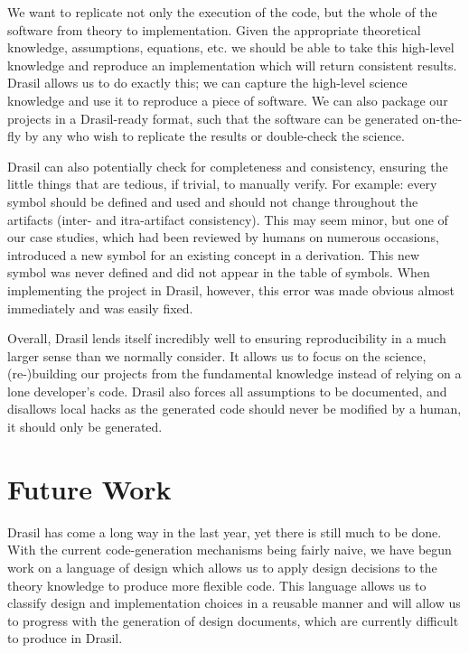 \documentclass[sigconf]{acmart}
\begin{document}
We want to replicate not only the execution of the code, but the whole of the 
software from theory to implementation. Given the appropriate theoretical 
knowledge, assumptions, equations, etc. we should be able to take this 
high-level knowledge and reproduce an implementation which will return 
consistent results. Drasil allows us to do exactly this; we can capture the 
high-level science knowledge and use it to reproduce a piece of software. We 
can also package our projects in a Drasil-ready format, such that the software 
can be generated on-the-fly by any who wish to replicate the results or 
double-check the science.

Drasil can also potentially check for completeness and consistency, ensuring 
the little things that are tedious, if trivial, to manually verify. For 
example: every symbol should be defined and used and should not change 
throughout the artifacts (inter- and itra-artifact consistency). This may seem 
minor, but one of our case studies, which had been reviewed by humans on 
numerous occasions, introduced a new symbol for an existing concept in a 
derivation. This new symbol was never defined and did not appear in the table of 
symbols. When implementing the project in Drasil, however, this error was made 
obvious almost immediately and was easily fixed.

Overall, Drasil lends itself incredibly well to ensuring reproducibility in a 
much larger sense than we normally consider. It allows us to focus on the 
science, (re-)building our projects from the fundamental knowledge instead of 
relying on a lone developer's code. Drasil also forces all assumptions to be 
documented, and disallows local hacks as the generated code should never be 
modified by a human, it should only be generated.

\section{Future Work} \label{SecFuture}

Drasil has come a long way in the last year, yet there is still much to be 
done. With the current code-generation mechanisms being fairly naive, we have 
begun work on a language of design which allows us to apply design decisions to 
the theory knowledge to produce more flexible code. This language allows us to 
classify design and implementation choices in a reusable manner and will 
allow us to progress with the generation of design documents, which are 
currently difficult to produce in Drasil.
\end{document}
